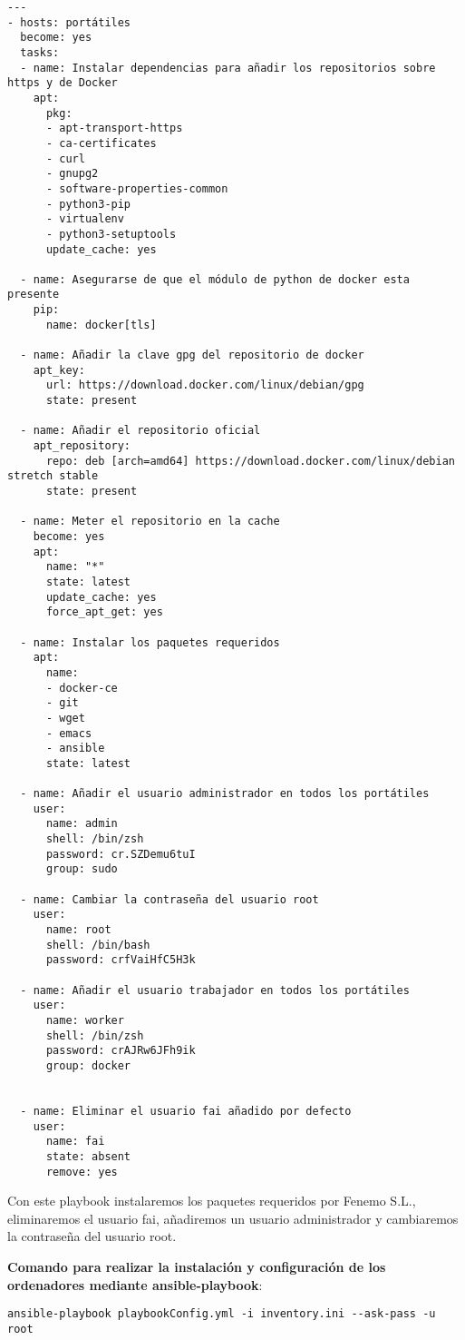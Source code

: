 \documentclass[11pt]{article}
\begin{document}
\begin{verbatim}
---
- hosts: portátiles
  become: yes
  tasks:
  - name: Instalar dependencias para añadir los repositorios sobre https y de Docker
    apt:
      pkg:
      - apt-transport-https
      - ca-certificates
      - curl
      - gnupg2
      - software-properties-common
      - python3-pip
      - virtualenv
      - python3-setuptools
      update_cache: yes

  - name: Asegurarse de que el módulo de python de docker esta presente
    pip:
      name: docker[tls]

  - name: Añadir la clave gpg del repositorio de docker
    apt_key:
      url: https://download.docker.com/linux/debian/gpg
      state: present

  - name: Añadir el repositorio oficial
    apt_repository:
      repo: deb [arch=amd64] https://download.docker.com/linux/debian stretch stable
      state: present

  - name: Meter el repositorio en la cache
    become: yes
    apt:
      name: "*"
      state: latest
      update_cache: yes
      force_apt_get: yes

  - name: Instalar los paquetes requeridos
    apt:
      name:
      - docker-ce
      - git
      - wget
      - emacs
      - ansible
      state: latest

  - name: Añadir el usuario administrador en todos los portátiles
    user:
      name: admin
      shell: /bin/zsh
      password: cr.SZDemu6tuI
      group: sudo

  - name: Cambiar la contraseña del usuario root
    user:
      name: root
      shell: /bin/bash
      password: crfVaiHfC5H3k

  - name: Añadir el usuario trabajador en todos los portátiles
    user:
      name: worker
      shell: /bin/zsh
      password: crAJRw6JFh9ik
      group: docker


  - name: Eliminar el usuario fai añadido por defecto
    user:
      name: fai
      state: absent
      remove: yes
\end{verbatim}

Con este playbook instalaremos los paquetes requeridos por Fenemo S.L., eliminaremos el usuario fai, añadiremos un usuario administrador y cambiaremos la contraseña del usuario root.

\textbf{Comando para realizar la instalación y configuración de los ordenadores mediante ansible-playbook}:

\begin{verbatim}
ansible-playbook playbookConfig.yml -i inventory.ini --ask-pass -u root
\end{verbatim}
\end{document}
